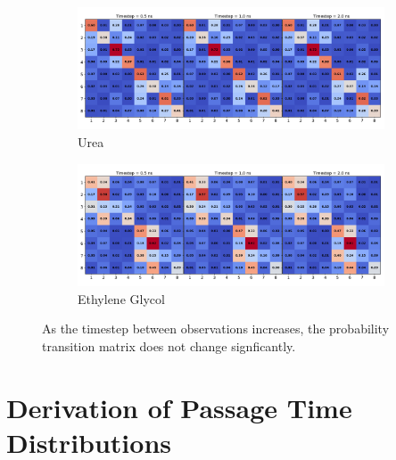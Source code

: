 \documentclass{article}
\begin{document}
  \begin{figure}
  \centering
  \begin{subfigure}{\textwidth}
  \includegraphics[width=\textwidth]{URE_transitions.pdf}
  \caption{Urea}\label{fig:URE_transitions}
  \end{subfigure}
  \begin{subfigure}{\textwidth}
  \includegraphics[width=\textwidth]{GCL_transitions.pdf}
  \caption{Ethylene Glycol}\label{fig:GCL_transitions}
  \end{subfigure}
  \caption{As the timestep between observations increases, the probability
  transition matrix does not change signficantly.}\label{fig:transitions}
  \end{figure}
  
  \newpage  
  
  \section{Derivation of Passage Time Distributions}\label{section:fpt_derivation}
  
\end{document}
